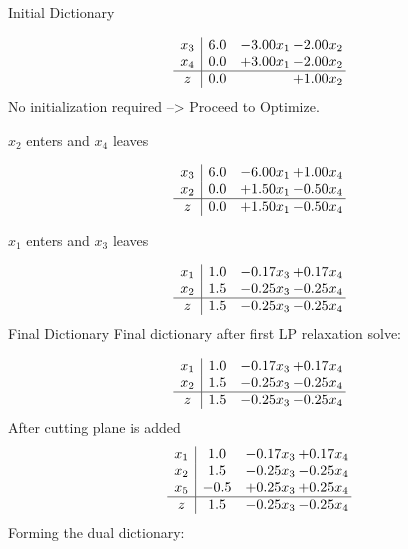 \documentclass[8pt]{article}
\begin{document}
Initial Dictionary 

\[\begin{array}{c| c c@{\hskip 2pt} c@{\hskip 2pt} }
 x_{3}   &  6.0 & -3.00 x_{1} & -2.00 x_{2}\\
 x_{4}   &  0.0 & +  3.00 x_{1} & -2.00 x_{2}\\
\hline
z    &  0.0  &   & +  1.00 x_{2}\\
\end{array}\]
No initialization required --> Proceed to Optimize. 


 $ x_{2} $ enters and $ x_{4} $ leaves 

 \[\begin{array}{c| c c@{\hskip 2pt} c@{\hskip 2pt} }
 x_{3}   &  6.0 & -6.00 x_{1} & +  1.00 x_{4}\\
 x_{2}   &  0.0 & +  1.50 x_{1} & -0.50 x_{4}\\
\hline
z    &  0.0 & +  1.50 x_{1} & -0.50 x_{4}\\
\end{array}\]


 $ x_{1} $ enters and $ x_{3} $ leaves 

 \[\begin{array}{c| c c@{\hskip 2pt} c@{\hskip 2pt} }
 x_{1}   &  1.0 & -0.17 x_{3} & +  0.17 x_{4}\\
 x_{2}   &  1.5 & -0.25 x_{3} & -0.25 x_{4}\\
\hline
z    &  1.5 & -0.25 x_{3} & -0.25 x_{4}\\
\end{array}\]
Final Dictionary
Final dictionary after first LP relaxation solve: 

\[\begin{array}{c| c c@{\hskip 2pt} c@{\hskip 2pt} }
 x_{1}   &  1.0 & -0.17 x_{3} & +  0.17 x_{4}\\
 x_{2}   &  1.5 & -0.25 x_{3} & -0.25 x_{4}\\
\hline
z    &  1.5 & -0.25 x_{3} & -0.25 x_{4}\\
\end{array}\]
 After cutting plane is added 
\[\begin{array}{c| c c@{\hskip 2pt} c@{\hskip 2pt} }
 x_{1}   &  1.0 & -0.17 x_{3} & +  0.17 x_{4}\\
 x_{2}   &  1.5 & -0.25 x_{3} & -0.25 x_{4}\\
 x_{5}   &  -0.5 & +  0.25 x_{3} & +  0.25 x_{4}\\
\hline
z    &  1.5 & -0.25 x_{3} & -0.25 x_{4}\\
\end{array}\]
Forming the dual dictionary:
\end{document}
